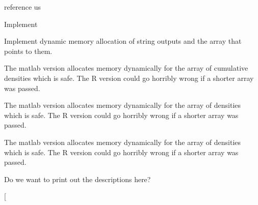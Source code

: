 \begin{DoxyRefList}
\item[\label{todo__todo000017}%
\hypertarget{todo__todo000017}{}%
Global \hyperlink{_hyper_sphere_geodesic_8h_a16d98ff2d1ad0e4d662b8631c72f9931}{Hyper\-Sphere\-Geodesic\-Distance\-P\-D\-F} (double t, double $\ast$parameters)]reference us  
\item[\label{todo__todo000018}%
\hypertarget{todo__todo000018}{}%
Global \hyperlink{_hyper_sphere_geodesic_8h_a203990a77a11670e5ab591d64461fca4}{Hyper\-Sphere\-Geodesic\-Distance\-Var} (double $\ast$parameters)]Implement  
\item[\label{todo__todo000024}%
\hypertarget{todo__todo000024}{}%
Global \hyperlink{group__api_gadb58de53bac5d2fe684019ce77be9896}{Line\-Picking\-All\-Problems} (char $\ast$$\ast$names, char $\ast$$\ast$, int $\ast$, double $\ast$$\ast$)]Implement dynamic memory allocation of string outputs and the array that points to them.  
\item[\label{todo__todo000027}%
\hypertarget{todo__todo000027}{}%
Global \hyperlink{group__api_ga445ba2c007d60d789747cecbd5f874b9}{Line\-Picking\-C\-D\-F} (double $\ast$, double $\ast$, int $\ast$, int $\ast$, double $\ast$, int $\ast$, int $\ast$, char $\ast$$\ast$)]The matlab version allocates memory dynamically for the array of cumulative densities which is safe. The R version could go horribly wrong if a shorter array was passed.  
\item[\label{todo__todo000028}%
\hypertarget{todo__todo000028}{}%
Global \hyperlink{group__api_ga89bd29435ffe1826e97dafb2b0536de1}{Line\-Picking\-Ncoords} (int $\ast$, char $\ast$$\ast$, int $\ast$, double $\ast$, int $\ast$, int $\ast$, char $\ast$$\ast$)]The matlab version allocates memory dynamically for the array of densities which is safe. The R version could go horribly wrong if a shorter array was passed.  
\item[\label{todo__todo000026}%
\hypertarget{todo__todo000026}{}%
Global \hyperlink{group__api_ga8feba9835984bd74f3d919f51389e573}{Line\-Picking\-P\-D\-F} (double $\ast$, double $\ast$, int $\ast$, int $\ast$, double $\ast$, int $\ast$, int $\ast$, char $\ast$$\ast$)]The matlab version allocates memory dynamically for the array of densities which is safe. The R version could go horribly wrong if a shorter array was passed.  
\item[\label{todo__todo000023}%
\hypertarget{todo__todo000023}{}%
Global \hyperlink{group__api_ga1a1c27d3c46da382a0443f810628a8ac}{Line\-Picking\-Print\-All\-Problems} (void)]Do we want to print out the descriptions here?  
\item[\label{todo__todo000022}%
$$
\end{DoxyRefList}
